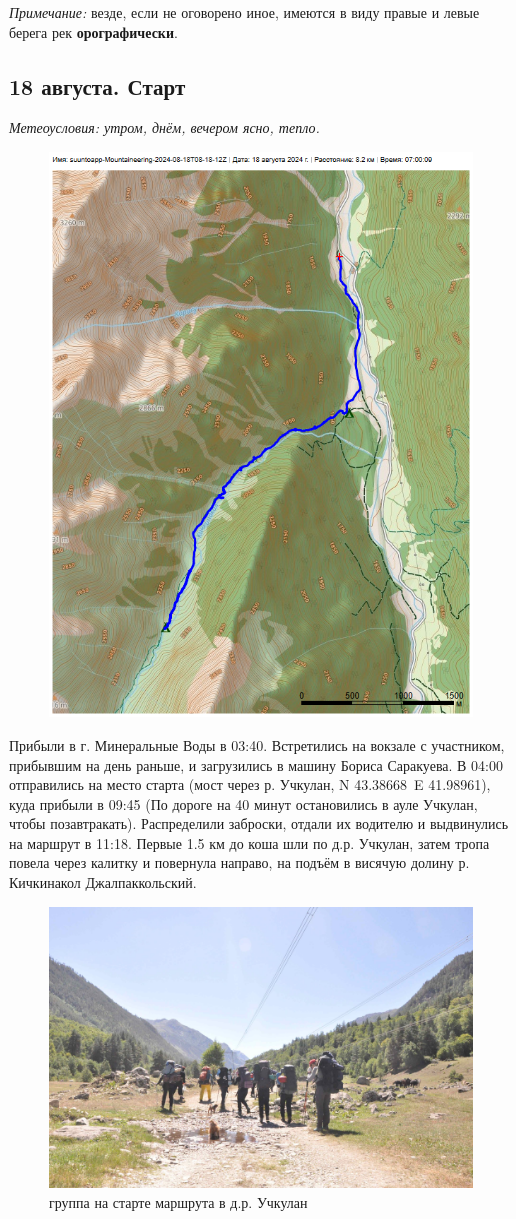 \textit{Примечание:} везде, если не оговорено иное, имеются в виду правые и левые берега рек \textbf{орографически}.
\subsection{18 августа. Старт}
\textit{Метеоусловия: утром, днём, вечером ясно, тепло.}

\begin{figure}[h!]
	\centering
	\includegraphics[angle=0, width=0.7\linewidth]{../pics/mini_maps/18}
	\label{fig:mini_18}
\end{figure}

Прибыли в г. Минеральные Воды в 03:40. Встретились на вокзале с участником, прибывшим на день раньше, и загрузились в машину Бориса Саракуева. В 04:00 отправились на место старта (мост через р. Учкулан, N 43.38668\degree~E 41.98961\degree), куда прибыли в 09:45 (По дороге на 40 минут остановились в ауле Учкулан, чтобы позавтракать). Распределили заброски, отдали их водителю и выдвинулись на маршрут в 11:18. Первые 1.5 км до коша шли по д.р. Учкулан, затем тропа повела через калитку и повернула направо, на подъём в висячую долину р. Кичкинакол Джалпаккольский.

\begin{figure}[h!]
	\centering
	\includegraphics[width=0.7\linewidth]{../pics/DSC_0412}
	\caption{группа на старте маршрута в д.р. Учкулан}
	\label{fig:uchkulan}
\end{figure}

